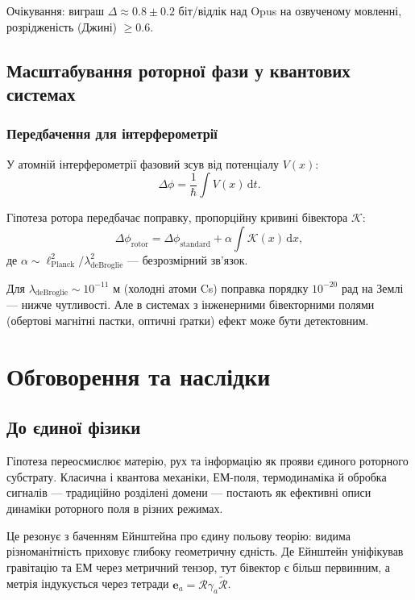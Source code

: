 \documentclass[11pt,a4paper]{article}
\newcommand{\rev}[1]{\widetilde{#1}}           %
\newcommand{\Rotor}{\mathcal{R}}
\theoremstyle{definition}
\theoremstyle{plain}
\theoremstyle{remark}
\begin{document}
Очікування: виграш $\Delta \approx 0.8 \pm 0.2$ біт/відлік над Opus на озвученому мовленні, розрідженість (Джині) $\ge 0.6$.

\subsection{Масштабування роторної фази у квантових системах}

\subsubsection{Передбачення для інтерферометрії}

У атомній інтерферометрії фазовий зсув від потенціалу $V(x)$:
\begin{equation}
\Delta\phi = \frac{1}{\hbar}\int V(x)\, \mathrm{d}t.
\end{equation}

Гіпотеза ротора передбачає поправку, пропорційну кривині бівектора $\mathcal{K}$:
\begin{equation}
\Delta\phi_{\text{rotor}} = \Delta\phi_{\text{standard}} + \alpha \int \mathcal{K}(x)\, \mathrm{d}x,
\end{equation}
де $\alpha \sim \ell_{\text{Planck}}^2/\lambda_{\text{deBroglie}}^2$ — безрозмірний зв’язок.

Для $\lambda_{\text{deBroglie}} \sim 10^{-11}$ м (холодні атоми Cs) поправка порядку $10^{-20}$ рад на Землі — нижче чутливості. Але в системах з інженерними бівекторними полями (обертові магнітні пастки, оптичні ґратки) ефект може бути детектовним.

\vspace{1em}

\section{Обговорення та наслідки}\label{sec:discussion}

\subsection{До єдиної фізики}

Гіпотеза переосмислює матерію, рух та інформацію як прояви єдиного роторного субстрату. Класична і квантова механіки, ЕМ-поля, термодинаміка й обробка сигналів — традиційно розділені домени — постають як ефективні описи динаміки роторного поля в різних режимах.

Це резонує з баченням Ейнштейна про єдину польову теорію: видима різноманітність приховує глибоку геометричну єдність. Де Ейнштейн уніфікував гравітацію та ЕМ через метричний тензор, тут бівектор є більш первинним, а метрія індукується через тетради $\mathbf{e}_a = \Rotor \gamma_a \rev{\Rotor}$.
\end{document}
